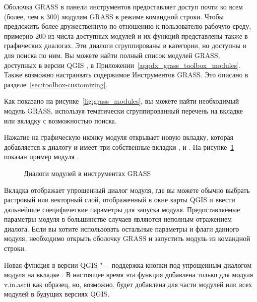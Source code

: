 Оболочка GRASS в панели инструментов предоставляет доступ почти ко всем
(более, чем к 300) модулям GRASS в режиме командной строки. Чтобы
предложить более дружественную по отношению к пользователю рабочую среду,
примерно 200 из числа доступных модулей и их функций представлены также
в графических диалогах. Эти диалоги сгруппированы в категории, но
доступны и для поиска по ним. Вы можете найти полный список модулей
GRASS, доступных в версии QGIS \CURRENT, в
Приложении~\ref{appdx_grass_toolbox_modules}. Также возможно настраивать
содержимое Инструментов GRASS. Это описано в
разделе~\ref{sec:toolbox-customizing}.

Как показано на рисунке~\ref{fig:grass_modules}, вы можете найти
необходимый модуль GRASS, используя тематически сгруппированный
перечень на вкладке  или вкладку 
с возможностью поиска.

Нажатие на графическую иконку модуля открывает новую вкладку, которая
добавляется к диалогу и имеет три собственные вкладки ,
 и . На рисунке~\ref{fig:grass_module_dialog}
показан пример модуля .

\begin{figure}[h]
\centering
   \hspace{1cm}
   \hspace{1cm}
\caption{Диалоги модулей в инструментах GRASS \nixcaption}\label{fig:grass_module_dialog}
\end{figure}
\FloatBarrier
{}

Вкладка  отображает упрощенный диалог модуля, где вы
можете обычно выбрать растровый или векторный слой, отображенный в окне
карты QGIS и ввести дальнейшие специфические параметры для запуска
модуля. Предоставляемые параметры модуля в большинстве случаев являются
неполным отражением диалога. Если вы хотите использовать остальные
параметры и флаги данного модуля, необходимо открыть оболочку GRASS и
запустить модуль из командной строки.

Новая функция в версии QGIS \CURRENT "--- поддержка кнопки
 под упрощенным диалогом
модуля на вкладке . В настоящее время эта функция
добавлена только для модуля v.in.ascii как образец, но, возможно, будет
добавлена для части модулей или всех модулей в будущих версиях QGIS.

